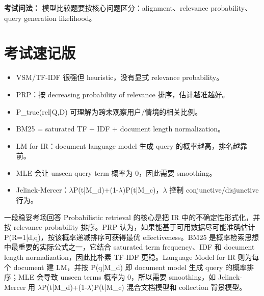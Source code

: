 \documentclass[11pt,a4paper]{ctexart}
\begin{document}
\noindent\textbf{考试问法：} 模型比较题要按核心问题区分：alignment、relevance probability、query generation likelihood。

\section{考试速记版}
\begin{itemize}
\item VSM/TF-IDF 很强但 heuristic，没有显式 relevance probability。
\item PRP：按 decreasing probability of relevance 排序，估计越准越好。
\item P\_true(rel|Q,D) 可理解为跨未观察用户/情境的相关比例。
\item BM25 = saturated TF + IDF + document length normalization。
\item LM for IR：document language model 生成 query 的概率越高，排名越靠前。
\item MLE 会让 unseen query term 概率为 0，因此需要 smoothing。
\item Jelinek-Mercer：\(\lambda\)P(t|M\_d)+(1-\(\lambda\))P(t|M\_c)，\(\lambda\) 控制 conjunctive/disjunctive 行为。
\end{itemize}
\begin{callout}{一段稳妥考场回答}
Probabilistic retrieval 的核心是把 IR 中的不确定性形式化，并按 relevance probability 排序。PRP 认为，如果能基于可用数据尽可能准确估计 P(R=1|d,q)，按该概率递减排序可获得最优 effectiveness。BM25 是概率检索思想中最重要的实际公式之一，它结合 saturated term frequency、IDF 和 document length normalization，因此比朴素 TF-IDF 更稳。Language Model for IR 则为每个 document 建 LM，并按 P(q|M\_d) 即 document model 生成 query 的概率排序；MLE 会导致 unseen terms 概率为 0，所以需要 smoothing，如 Jelinek-Mercer 用 \(\lambda\)P(t|M\_d)+(1-\(\lambda\))P(t|M\_c) 混合文档模型和 collection 背景模型。
\end{callout}
\end{document}
